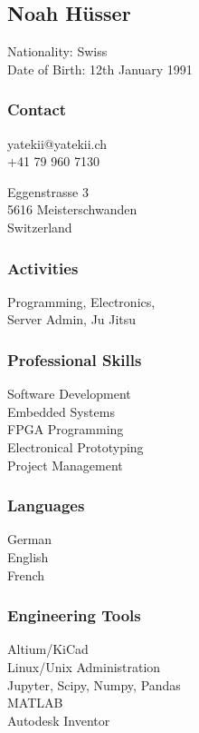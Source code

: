 \documentclass[]{resume}
\begin{document}
%
%
%
\begin{facts}
\sectionsep
\section{Noah Hüsser}
Nationality: Swiss\\
Date of Birth: 12th January 1991
\sectionsep

\subsubsection{Contact}
yatekii@yatekii.ch\\
+41 79 960 7130\par
\vspace{\baselineskip}
Eggenstrasse 3\\
5616 Meisterschwanden\\
Switzerland
\sectionsep

\subsubsection{Activities}
Programming, Electronics,\\
Server Admin, Ju Jitsu
\sectionsep

\subsubsection{Professional Skills}
Software Development\\
Embedded Systems\\
FPGA Programming\\
Electronical Prototyping\\
Project Management
\sectionsep

\subsubsection{Languages}
German \\
English \\
French 
\sectionsep

\subsubsection{Engineering Tools}
Altium/KiCad\\
Linux/Unix Administration\\
Jupyter, Scipy, Numpy, Pandas\\
MATLAB\\
Autodesk Inventor
\sectionsep


\end{facts}
\end{document}
